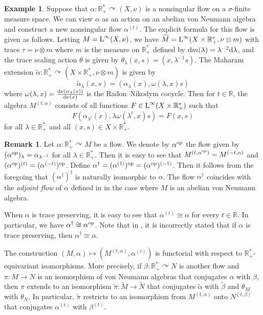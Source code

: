 \documentclass[a4paper,11pt]{amsart}
\numberwithin{equation}{section}
\theoremstyle{definition}
\newtheorem{remark}[theorem]{Remark}
\newtheorem{example}[theorem]{Example}
\newcommand{\R}{\mathbb{R}}
\newcommand{\rd}{\text{\rm d}}
\newcommand{\rL}{\mathord{\text{\rm L}}}
\newcommand{\op}{\mathord{\text{\rm op}}}
\begin{document}
\begin{example}
    Suppose that $\alpha : \R^*_+ \curvearrowright (X,\nu)$ is a nonsingular flow on a $\sigma$-finite measure space. We can view $\alpha$ as an action on an abelian von Neumann algebra and construct a new nonsingular flow $\alpha^{(t)}$. The explicit formula for this flow is given as follows. Letting $M=\rL^\infty(X,\nu)$, we have $\widetilde{M}=\rL^\infty(X \times \R^*_+,\nu \otimes m)$ with trace $\tau=\nu \otimes m$ where $m$ is the measure on $\R^*_+$ defined by $\rd m(\lambda) = \lambda^{- 2}\rd \lambda$, and the trace scaling action $\theta$ is given by $\theta_\lambda(x,s)=(x,\lambda^{-1}s)$. The Maharam extension $\widetilde{\alpha} : \R^*_+ \curvearrowright (X \times \R^*_+, \nu \otimes m)$ is given by
    $$ \widetilde{\alpha}_\lambda(x,s)=(\alpha_\lambda(x), \omega(\lambda,x) s)$$
    where $\omega(\lambda,x)=\frac{\rd \nu (\alpha_\lambda(x))}{\rd \nu(x)}$ is the Radon--Nikodym cocycle. Then for $t \in \R$, the algebra $M^{(t,\alpha)}$ consists of all functions $F \in \rL^\infty(X \times \R^*_+)$ such that $$F(\alpha_{\lambda^t}(x), \lambda \omega(\lambda^t,x) s) =F(x,s)$$ for all $\lambda \in \R^*_+$ and all $(x,s) \in X \times \R^*_+$. 
\end{example}

\begin{remark}
Let $\alpha : \R^*_+ \curvearrowright M$ be a flow. We denote by $\alpha^{\op}$ the flow given by $(\alpha^{\op})_\lambda= \alpha_{\lambda^{-1}}$ for all $\lambda \in \R^*_+$. Then it is easy to see that $M^{(t,\alpha^{\op})} = M^{(-t,\alpha)}$ and $(\alpha^{\op} )^{(t)}= (\alpha^{(-t)})^{\op}$. Define $\alpha^{\dagger}=(\alpha^{(1)})^{\op}=(\alpha^{\op} )^{(-1)}$. Then it follows from the foregoing that $(\alpha^{\dagger})^{\dagger}$ is naturally isomorphic to $\alpha$. The flow $\alpha^\dagger$ coincides with the {\em adjoint flow} of $\alpha$ defined in \cite{VV22} in the case where $M$ is an abelian von Neumann algebra. 

When $\alpha$ is trace preserving, it is easy to see that $\alpha^{(t)} \cong \alpha$ for every $t \in \R$. In particular, we have $\alpha^\dagger \cong \alpha^{\op}$. Note that in \cite[Section 3]{VV22}, it is incorrectly stated that if $\alpha$ is trace preserving, then $\alpha^\dagger \cong \alpha$.
\end{remark}

The construction $(M,\alpha) \mapsto (M^{(t,\alpha)},\alpha^{(t)})$ is functorial with respect to $\R^*_+$-equivariant isomorphisms. More precisely, if $\beta : \R^*_+ \curvearrowright N$ is another flow and $\pi : M \rightarrow N$ is an isomorphism of von Neumann algebras that conjugates $\alpha$ with $\beta$, then $\pi$ extends to an isomorphism $\widetilde{\pi} : \widetilde{M} \rightarrow \widetilde{N}$ that conjugates $\widetilde{\alpha}$ with $\widetilde{\beta}$ and $\theta_M$ with $\theta_N$. In particular, $\widetilde{\pi}$ restricts to an isomorphism from $M^{(t,\alpha)}$ onto $N^{(t,\beta)}$ that conjugates $\alpha^{(t)}$ with $\beta^{(t)}$. 
\end{document}
